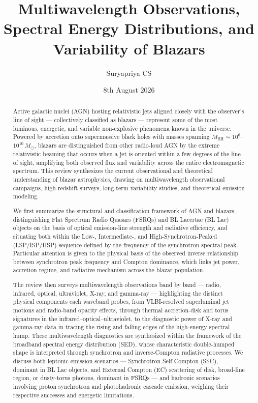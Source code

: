 \documentclass[11pt]{article}
\title{Multiwavelength Observations, Spectral Energy Distributions, and Variability of Blazars}
\author{Suryapriya CS}
\date{8th August 2026}
\begin{document}
\maketitle

\begin{abstract}
\noindent
Active galactic nuclei (AGN) hosting relativistic jets aligned closely with the observer's line of sight --- collectively classified as blazars --- represent some of the most luminous, energetic, and variable non-explosive phenomena known in the universe. Powered by accretion onto supermassive black holes with masses spanning $M_{\mathrm{BH}} \sim 10^{6}$--$10^{10}\,M_{\odot}$, blazars are distinguished from other radio-loud AGN by the extreme relativistic beaming that occurs when a jet is oriented within a few degrees of the line of sight, amplifying both observed flux and variability across the entire electromagnetic spectrum. This review synthesizes the current observational and theoretical understanding of blazar astrophysics, drawing on multiwavelength observational campaigns, high-redshift surveys, long-term variability studies, and theoretical emission modeling.

We first summarize the structural and classification framework of AGN and blazars, distinguishing Flat Spectrum Radio Quasars (FSRQs) and BL Lacertae (BL Lac) objects on the basis of optical emission-line strength and radiative efficiency, and situating both within the Low-, Intermediate-, and High-Synchrotron-Peaked (LSP/ISP/HSP) sequence defined by the frequency of the synchrotron spectral peak. Particular attention is given to the physical basis of the observed inverse relationship between synchrotron peak frequency and Compton dominance, which links jet power, accretion regime, and radiative mechanism across the blazar population.

The review then surveys multiwavelength observations band by band --- radio, infrared, optical, ultraviolet, X-ray, and gamma-ray --- highlighting the distinct physical components each waveband probes, from VLBI-resolved superluminal jet motions and radio-band opacity effects, through thermal accretion-disk and torus signatures in the infrared--optical--ultraviolet, to the diagnostic power of X-ray and gamma-ray data in tracing the rising and falling edges of the high-energy spectral hump. These multiwavelength diagnostics are synthesized within the framework of the broadband spectral energy distribution (SED), whose characteristic double-humped shape is interpreted through synchrotron and inverse-Compton radiative processes. We discuss both leptonic emission scenarios --- Synchrotron Self-Compton (SSC), dominant in BL Lac objects, and External Compton (EC) scattering of disk, broad-line region, or dusty-torus photons, dominant in FSRQs --- and hadronic scenarios involving proton synchrotron and photohadronic cascade emission, weighing their respective successes and energetic limitations.


\end{abstract}
\end{document}
